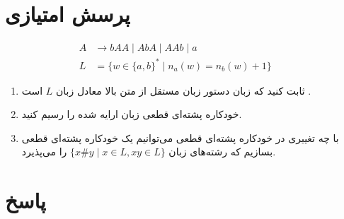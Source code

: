 \section*{پرسش امتیازی}
\[
\begin{aligned}
	A &\rightarrow bAA \mid AbA \mid AAb \mid a \quad & & \\
	L &= \{ w \in \{a, b\}^* \mid n_a(w) = n_b(w) + 1 \}
\end{aligned}
\]
\begin{enumerate}
	\item {ثابت کنید که زبان دستور زبان مستقل از متن بالا معادل زبان \( L \) است .} 
	\item {خودکاره پشته‌ا‌‌‌ی قطعی زبان ارایه شده را رسیم کنید.} 
	\item {با چه تغییری در خودکاره پشته‌ا‌‌‌‌‌ی‌  قطعی می‌توانیم یک خودکاره پشته‌ای قطعی بسازیم که رشته‌های زبان \(\{ x \# y \mid x \in L, xy \in L \}\) را می‌پذیرد.} 
\end{enumerate}


\section*{پاسخ}


